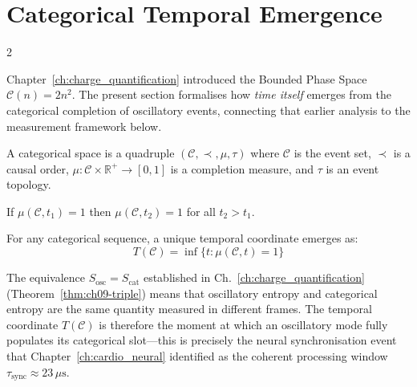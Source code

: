 \section{Categorical Temporal Emergence}

\begin{multicols}{2}

Chapter~\ref{ch:charge_quantification} introduced the Bounded Phase Space $\mathcal{C}(n) = 2n^2$. The present section formalises how \emph{time itself} emerges from the categorical completion of oscillatory events, connecting that earlier analysis to the measurement framework below.

\begin{definition}
A categorical space is a quadruple $(\mathcal{C}, \prec, \mu, \tau)$ where $\mathcal{C}$ is the event set, $\prec$ is a causal order, $\mu : \mathcal{C} \times \mathbb{R}^+ \to [0,1]$ is a completion measure, and $\tau$ is an event topology.
\end{definition}

\begin{axiom}[Irreversibility]
If $\mu(\mathcal{C}, t_1) = 1$ then $\mu(\mathcal{C}, t_2) = 1$ for all $t_2 > t_1$.
\end{axiom}

\begin{theorem}
\label{thm:ch10-temporal}
For any categorical sequence, a unique temporal coordinate emerges as:
\begin{equation}
T(\mathcal{C}) = \inf\{t : \mu(\mathcal{C}, t) = 1\}
\end{equation}
\end{theorem}

The equivalence $S_{\mathrm{osc}} = S_{\mathrm{cat}}$ established in Ch.~\ref{ch:charge_quantification} (Theorem~\ref{thm:ch09-triple}) means that oscillatory entropy and categorical entropy are the same quantity measured in different frames. The temporal coordinate $T(\mathcal{C})$ is therefore the moment at which an oscillatory mode fully populates its categorical slot---this is precisely the neural synchronisation event that Chapter~\ref{ch:cardio_neural} identified as the coherent processing window $\tau_{\mathrm{sync}} \approx 23\,\mu\mathrm{s}$.

\end{multicols}

